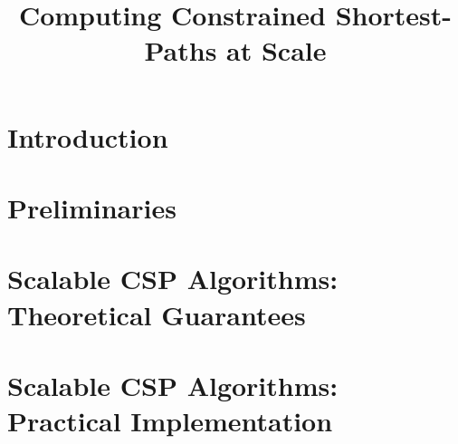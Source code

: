 \documentclass{article}
\title{Computing Constrained Shortest-Paths at Scale}
\author{}
\theoremstyle{plain}
\theoremstyle{definition}
\begin{document}
\maketitle

\begin{abstract}
	
\end{abstract}

\section{Introduction}


\section{Preliminaries}
\label{sec:prelim}



\section{Scalable CSP Algorithms:\texorpdfstring{\\}{ } Theoretical Guarantees}
\label{sec:chd}



\section{Scalable CSP Algorithms: \texorpdfstring{\\}{ } Practical Implementation}
\label{sec:numeric}




\end{document}
